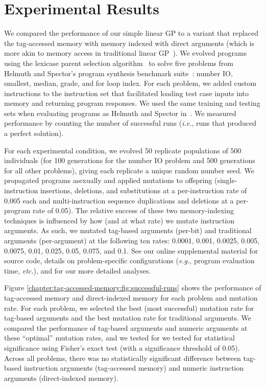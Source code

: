 \section{Experimental Results}

We compared the performance of our simple linear GP to a variant that replaced the tag-accessed memory with memory indexed with direct arguments (which is more akin to memory access in traditional linear GP~\citep{brameier_linear_2007}).
We evolved programs using the lexicase parent selection algorithm~\cite{helmuth_solving_2015} to solve five problems from Helmuth and Spector's program synthesis benchmark suite~\citep{helmuth_general_2015}: number IO, smallest, median, grade, and for loop index.
For each problem, we added custom instructions to the instruction set that facilitated loading test case inputs into memory and returning program responses. 
We used the same training and testing sets when evaluating programs as Helmuth and Spector in~\citep{helmuth_general_2015}.
We measured performance by counting the number of successful runs (\textit{i.e.}, runs that produced a perfect solution).%

For each experimental condition, we evolved 50 replicate populations of 500 individuals (for 100 generations for the number IO problem and 500 generations for all other problems), giving each replicate a unique random number seed.
We propagated programs asexually and applied mutations to offspring (single-instruction insertions, deletions, and substitutions at a per-instruction rate of 0.005 each and multi-instruction sequence duplications and deletions at a per-program rate of 0.05). 
The relative success of these two memory-indexing techniques is influenced by how (and at what rate) we mutate instruction arguments.
As such, we mutated tag-based arguments (per-bit) and traditional arguments (per-argument) at the following ten rates: 0.0001, 0.001, 0.0025, 0.005, 0.0075, 0.01, 0.025, 0.05, 0.075, and 0.1. 
See our online supplemental material \citep{tag_accessed_memory_supplement_2019} for source code, details on problem-specific configurations (\textit{e.g.}, program evaluation time, \textit{etc.}), and for our more detailed analyses.



Figure \ref{chapter:tag-accessed-memory:fig:successful-runs} shows the performance of tag-accessed memory and direct-indexed memory for each problem and mutation rate.
For each problem, we selected the best (most successful) mutation rate for tag-based arguments and the best mutation rate for traditional arguments.
We compared the performance of tag-based arguments and numeric arguments at these ``optimal'' mutation rates, and we tested for we tested for statistical significance using Fisher's exact test (with a significance threshold of 0.05). 
Across all problems, there was no statistically significant difference between tag-based instruction arguments (tag-accessed memory) and numeric instruction arguments (direct-indexed memory).

